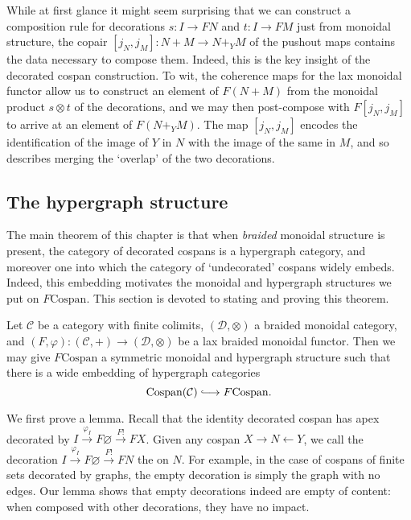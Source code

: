 \begin{remark}
While at first glance it might seem surprising that we can construct a
composition rule for decorations $s\colon  I\to FN$ and $t\colon  I \to FM$ just from
monoidal structure, the copair $[j_N,j_M]\colon  N+M \to N+_YM$ of the pushout maps
contains the data necessary to compose them. Indeed, this is the key insight of the
decorated cospan construction. To wit, the coherence maps for the lax monoidal
functor allow us to construct an element of $F(N+M)$ from the monoidal product
$s \otimes t$ of the decorations, and we may then post-compose with $F[j_N,j_M]$ to
arrive at an element of $F(N+_YM)$. The map $[j_N,j_M]$ encodes the
identification of the image of $Y$ in $N$ with the image of the same in $M$, and
so describes merging the `overlap' of the two decorations.
\end{remark}


\subsection{The hypergraph structure}
The main theorem of this chapter is that when \emph{braided} monoidal structure
is present, the category of decorated cospans is a hypergraph category, and
moreover one into which the category of `undecorated' cospans widely embeds.
Indeed, this embedding motivates the monoidal and hypergraph structures we put
on $F\mathrm{Cospan}$. This section is devoted to stating and proving this
theorem.

\begin{theorem} \label{thm:fcospans}
  Let $\mathcal C$ be a category with finite colimits, $(\mathcal D, \otimes)$ a
  braided monoidal category, and $(F,\varphi)\colon  (\mathcal C,+) \to (\mathcal D,
  \otimes)$ be a lax braided monoidal functor. Then we may give
  $F\mathrm{Cospan}$ a symmetric monoidal and hypergraph structure such that
  there is a wide embedding of hypergraph categories
  \[
    \mathrm{Cospan(\mathcal C)} \hooklongrightarrow F\mathrm{Cospan}.
  \]
\end{theorem}

We first prove a lemma.  Recall that the identity decorated cospan has apex
decorated by $I \stackrel{\varphi_I}\longrightarrow F\varnothing
\stackrel{F!}\longrightarrow FX$. Given any cospan $X \to N \leftarrow Y$, we
call the decoration $I \stackrel{\varphi_I}\longrightarrow F\varnothing
\stackrel{F!}\longrightarrow FN$ the  on $N$. For
example, in the case of cospans of finite sets decorated by graphs, the empty
decoration is simply the graph with no edges. Our lemma shows that empty
decorations indeed are empty of content: when composed with other decorations,
they have no impact.

